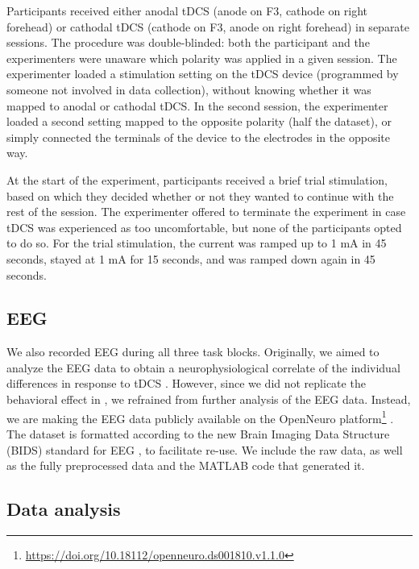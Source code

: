 \documentclass[11pt,english,]{memoir}
\let\rmarkdownfootnote\footnote%
\def\footnote{\protect\rmarkdownfootnote}
\renewcommand{\href}[2]{#2\footnote{\url{#1}}} %
\begin{document}
Participants received either anodal tDCS (anode on F3, cathode on right forehead) or cathodal tDCS (cathode on F3, anode on right forehead) in separate sessions. The procedure was double-blinded: both the participant and the experimenters were unaware which polarity was applied in a given session. The experimenter loaded a stimulation setting on the tDCS device (programmed by someone not involved in data collection), without knowing whether it was mapped to anodal or cathodal tDCS. In the second session, the experimenter loaded a second setting mapped to the opposite polarity (half the dataset), or simply connected the terminals of the device to the electrodes in the opposite way.

At the start of the experiment, participants received a brief trial stimulation, based on which they decided whether or not they wanted to continue with the rest of the session. The experimenter offered to terminate the experiment in case tDCS was experienced as too uncomfortable, but none of the participants opted to do so. For the trial stimulation, the current was ramped up to 1 mA in 45 seconds, stayed at 1 mA for 15 seconds, and was ramped down again in 45 seconds.

\hypertarget{AB_tDCS-EEGdata}{%
\subsection{EEG}\label{AB_tDCS-EEGdata}}

We also recorded EEG during all three task blocks. Originally, we aimed to analyze the EEG data to obtain a neurophysiological correlate of the individual differences in response to tDCS \autocites{Krause2014}{Li2015b}{Harty2017}. However, since we did not replicate the behavioral effect in \textcite{London2015}, we refrained from further analysis of the EEG data. Instead, we are making the EEG data publicly available \href{https://doi.org/10.18112/openneuro.ds001810.v1.1.0}{on the OpenNeuro platform} \autocite{Reteig2019_data}. The dataset is formatted according to the new Brain Imaging Data Structure (BIDS) standard \autocite{Gorgolewski2016} for EEG \autocite{Pernet2018}, to facilitate re-use. We include the raw data, as well as the fully preprocessed data and the MATLAB code that generated it.

\hypertarget{data-analysis}{%
\subsection{Data analysis}\label{data-analysis}}
\end{document}
